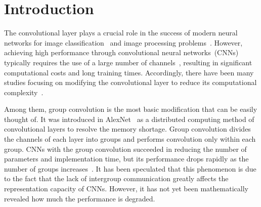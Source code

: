 \documentclass[preprint,12pt,authoryear]{elsarticle}
\numberwithin{equation}{section}
\theoremstyle{remark}
\begin{document}
\section{Introduction}
\label{Sec:Int}
The convolutional layer plays a crucial role in the success of modern neural networks for image classification~\citep{he2016deep,hu2018squeeze,krizhevsky2012imagenet} and image processing problems~\citep{radford2015unsupervised,ronneberger2015u,zhang2017beyond}.
However, achieving high performance through convolutional neural networks~(CNNs) typically requires the use of a large number of channels~\citep{brock2021high,he2022approximation,huang2019gpipe,tan2019efficientnet,zagoruyko2016wide}, resulting in significant computational costs and long training times.
Accordingly, there have been many studies focusing on modifying the convolutional layer to reduce its computational complexity~\citep{gholami2021survey,krizhevsky2012imagenet,lee2022two,liu2020pruning,zhang2015accelerating,zhang2015efficient}.

Among them, group convolution is the most basic modification that can be easily thought of.
It was introduced in AlexNet~\citep{krizhevsky2012imagenet} as a distributed computing method of convolutional layers to resolve the memory shortage.
Group convolution divides the channels of each layer into groups and performs convolution only within each group.
CNNs with the group convolution succeeded in reducing the number of parameters and implementation time, but its performance drops rapidly as the number of groups increases~\citep{lee2022two,long2015fully}.
It has been speculated that this phenomenon is due to the fact that the lack of intergroup communication greatly affects the representation capacity of CNNs.
However, it has not yet been mathematically revealed how much the performance is degraded.
\end{document}
